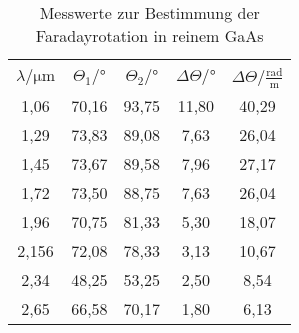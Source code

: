 \begin{table}[H]
  \centering
  \caption{Messwerte zur Bestimmung der Faradayrotation in reinem GaAs}
  \label{tab:tabe2}
    \begin{tabular}{S S S S S}
    \toprule \\
    {$\lambda / \si{\micro\metre} $} & {$\Theta_1 /° $} & {$\Theta_2 /° $} & {$\Delta \Theta /° $} &
    {$\Delta \Theta / \frac{\text{rad}}{\text{m}} $}\\
    ,06 & 70,16 & 93,75 & 11,80 & 40,29 \\
    1,29 & 73,83 & 89,08 & 7,63 & 26,04 \\
    1,45 & 73,67 & 89,58 & 7,96 & 27,17 \\
    1,72 & 73,50 & 88,75 & 7,63 & 26,04 \\
    1,96 & 70,75 & 81,33 & 5,30 & 18,07 \\
    2,156 & 72,08 & 78,33 & 3,13 & 10,67 \\
    2,34 & 48,25 & 53,25 & 2,50 & 8,54 \\
    2,65 & 66,58 & 70,17 & 1,80 & 6,13 \\


          \bottomrule
        \end{tabular}
\end{table}
